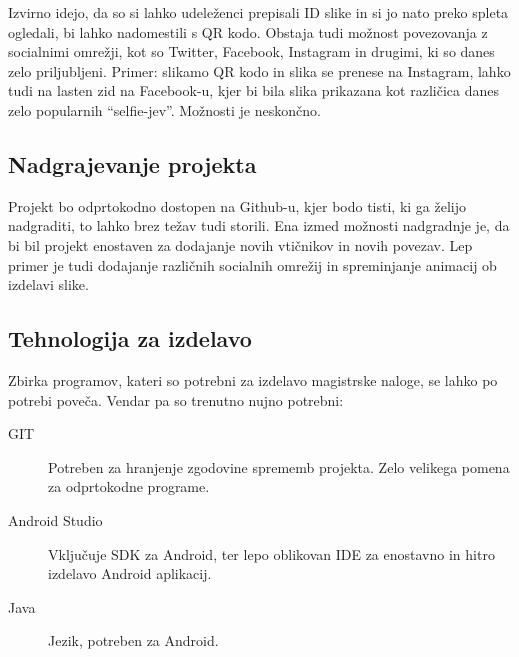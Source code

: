 Izvirno idejo, da so si lahko udeleženci prepisali ID slike in si jo nato preko spleta ogledali, bi lahko nadomestili s QR kodo. Obstaja tudi možnost povezovanja z socialnimi omrežji, kot so Twitter, Facebook, Instagram in drugimi, ki so danes zelo priljubljeni. Primer: slikamo QR kodo in slika se prenese na Instagram, lahko tudi na lasten zid na Facebook-u, kjer bi bila slika prikazana kot različica danes zelo popularnih ``selfie-jev''. Možnosti je neskončno.


\subsection{Nadgrajevanje projekta}
Projekt bo odprtokodno dostopen na Github-u, kjer bodo tisti, ki ga želijo nadgraditi, to lahko brez težav tudi storili. Ena izmed možnosti nadgradnje je, da bi bil projekt enostaven za dodajanje novih vtičnikov in novih povezav. Lep primer je tudi dodajanje različnih socialnih omrežij in spreminjanje animacij ob izdelavi slike.


\subsection{Tehnologija za izdelavo}
Zbirka programov, kateri so potrebni za izdelavo magistrske naloge, se lahko po potrebi poveča. Vendar pa so trenutno nujno potrebni:
\begin{description}
\item[GIT] Potreben za hranjenje zgodovine sprememb projekta. Zelo velikega pomena za odprtokodne programe.
\item[Android Studio] Vključuje SDK za Android, ter lepo oblikovan IDE za enostavno in hitro izdelavo Android aplikacij.
\item[Java] Jezik, potreben za Android.
\end{description}
